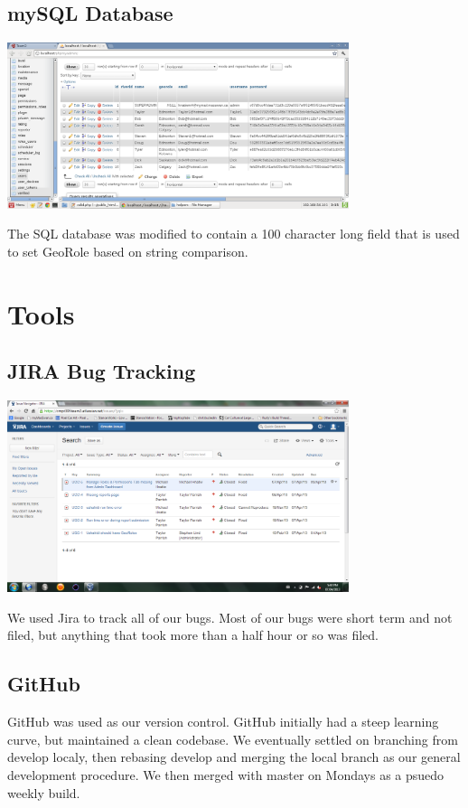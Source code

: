 \documentclass{article}
\begin{document}
\subsection{mySQL Database}
\begin{minipage}{\linewidth}
  \centering
  \includegraphics[width=100mm]{sql_table.png}
\end{minipage}
The SQL database was modified to contain a 100 character long field that is used to set GeoRole based on string comparison.

\section{Tools}
\subsection{JIRA Bug Tracking}
\begin{minipage}{\linewidth}
  \centering
  \includegraphics[width=100mm]{jira_bug_list.png}
\end{minipage}
We used Jira to track all of our bugs. Most of our bugs were short term and not filed, but anything that took more than a half hour or so was filed.
\subsection{GitHub}
GitHub was used as our version control. GitHub initially had a steep learning curve, but maintained a clean codebase. We eventually settled on branching from develop localy, then rebasing develop and merging the local branch as our general development procedure. We then merged with master on Mondays as a psuedo weekly build.
\end{document}
